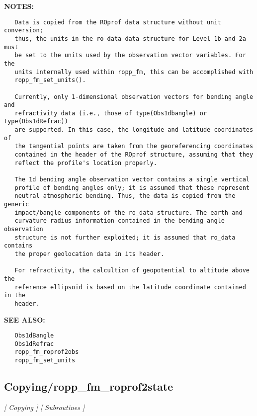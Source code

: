 \textbf{NOTES:}\hspace{0.08in}\begin{Verbatim}
   Data is copied from the ROprof data structure without unit conversion;
   thus, the units in the ro_data data structure for Level 1b and 2a must
   be set to the units used by the observation vector variables. For the
   units internally used within ropp_fm, this can be accomplished with
   ropp_fm_set_units().

   Currently, only 1-dimensional observation vectors for bending angle and
   refractivity data (i.e., those of type(Obs1dbangle) or type(Obs1dRefrac))
   are supported. In this case, the longitude and latitude coordinates of
   the tangential points are taken from the georeferencing coordinates
   contained in the header of the ROprof structure, assuming that they
   reflect the profile's location properly.

   The 1d bending angle observation vector contains a single vertical 
   profile of bending angles only; it is assumed that these represent
   neutral atmospheric bending. Thus, the data is copied from the generic
   impact/bangle components of the ro_data structure. The earth and 
   curvature radius information contained in the bending angle observation
   structure is not further exploited; it is assumed that ro_data contains
   the proper geolocation data in its header.

   For refractivity, the calcultion of geopotential to altitude above the
   reference ellipsoid is based on the latitude coordinate contained in the
   header.
\end{Verbatim}
\textbf{SEE ALSO:}\hspace{0.08in}\begin{Verbatim}
   Obs1dBangle
   Obs1dRefrac
   ropp_fm_roprof2obs
   ropp_fm_set_units
\end{Verbatim}
\subsection{Copying/ropp\_fm\_roprof2state}
\textsl{[ Copying ]}
\textsl{[ Subroutines ]}

